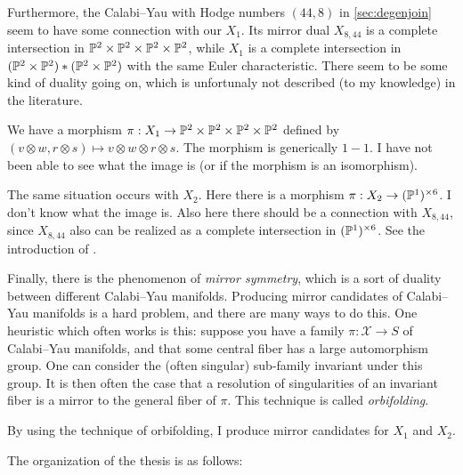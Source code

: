 Furthermore, the Calabi--Yau with Hodge numbers $(44,8)$ in \cref{sec:degenjoin} seem to have some connection with our $X_1$. Its mirror dual $X_{8,44}$ is a complete intersection in $\P^2 \times \P^2 \times \P^2 \times \P^2$, while $X_1$ is a complete intersection in $(\P^2 \times \P^2) \ast (\P^2 \times \P^2)$ with the same Euler characteristic. There seem to be some kind of duality going on, which is unfortunaly not described (to my knowledge) in the literature.

We have a morphism $\pi:X_1 \to \P^2 \times \P^2 \times \P^2 \times \P^2$ defined by $(v \otimes w, r \otimes s) \mapsto v \otimes w \otimes r \otimes s$. The morphism is generically $1-1$. I have not been able to see what the image is (or if the morphism is an isomorphism).

The same situation occurs with $X_2$. Here there is a morphism ${\pi:X_2 \to (\P^1)^{\times 6}}$. I don't know what the image is. Also here there should be a connection with $X_{8,44}$, since $X_{8,44}$ also can be realized as a complete intersection in $(\P^1)^{\times 6}$. See the introduction of \cite{braun_smallhodgenumbers}.

\hfill \break

Finally, there is the phenomenon of \emph{mirror symmetry}, which is a sort of duality between different Calabi--Yau manifolds. Producing mirror candidates of Calabi--Yau manifolds is a hard problem, and there are many ways to do this. One heuristic which often works is this: suppose you have a family $\pi: \mathscr X \to S$ of Calabi--Yau manifolds, and that some central fiber has a large automorphism group. One can consider the (often singular) sub-family invariant under this group. It is then often the case that a resolution of singularities of an invariant fiber is a mirror to the general fiber of $\pi$. This technique is called \emph{orbifolding}.

By using the technique of orbifolding, I produce mirror candidates for $X_1$ and $X_2$.

\hfill \break

The organization of the thesis is as follows:

